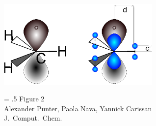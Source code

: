 \documentclass[12pt]{article}
\begin{document}
\begin{figure}
\begin{center}
\includegraphics[width=8cm]{scheme_complete.eps}
\end{center}
{\Large
\begin{minipage}[t]{3in}
\baselineskip = .5\baselineskip
Figure 2 \\
Alexander Punter, Paola Nava, Yannick Carissan\\
J.\ Comput.\ Chem.
\end{minipage}
}
\end{figure}

\clearpage
\end{document}

